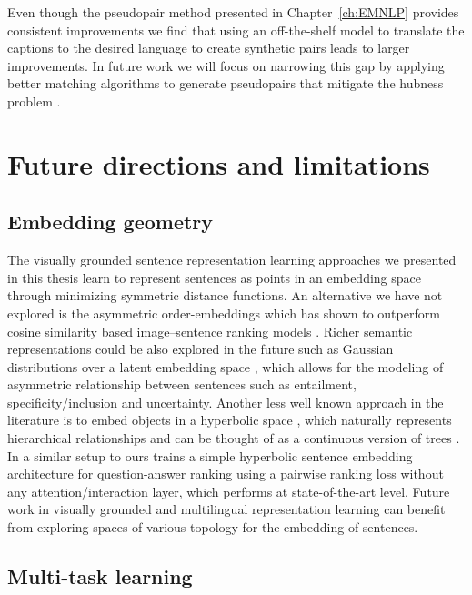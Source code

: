 Even though the pseudopair method presented in Chapter~\ref{ch:EMNLP} provides consistent improvements
we find that using an off-the-shelf model to translate the captions to the desired language to create 
synthetic pairs leads to larger improvements. In future work we will focus on narrowing this gap by applying
better matching algorithms to generate pseudopairs that mitigate the hubness problem \cite{radovanovic2010existence,tomavsev2011influence,tomavsev2011probabilistic,dinu2014improving}. 

 

\section{Future directions and limitations}

\subsection{Embedding geometry}

The visually grounded sentence representation learning approaches 
we presented in this thesis learn to represent sentences as points
in an embedding space through minimizing symmetric distance functions. 
An alternative we have not explored is the asymmetric order-embeddings 
\citep{vendrov2015order} which has shown to outperform cosine similarity based 
image--sentence ranking models \citep{faghri2017vse++}. 
Richer semantic representations could be also explored in the future such as Gaussian 
distributions over a latent embedding 
space \citep{vilnis2014word}, which allows for the modeling of asymmetric relationship between sentences
such as entailment, specificity/inclusion and uncertainty. 
Another less well known approach in the literature is to embed objects in a
hyperbolic space \citep{nickel2017poincare}, which naturally represents hierarchical relationships and 
can be thought of as a continuous version of trees \citep{krioukov2010hyperbolic}. 
In a similar setup to ours \cite{tay2018hyperbolic} 
trains a simple hyperbolic sentence embedding architecture for question-answer 
ranking using a pairwise ranking loss without any attention/interaction layer, 
which performs at state-of-the-art level.
Future work in visually grounded and multilingual representation learning can benefit from exploring
spaces of various topology for the embedding of sentences. 



\subsection{Multi-task learning}

